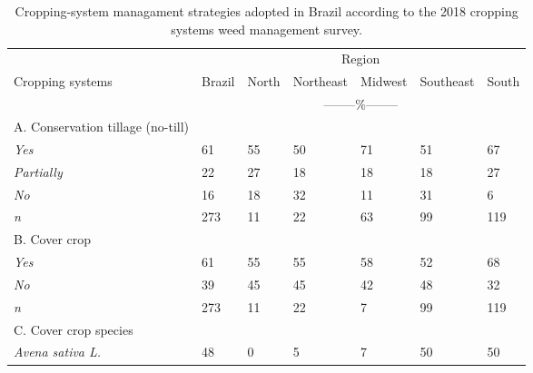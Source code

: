 \documentclass[
  12pt,
  a4paper]{article}
\begin{document}
\begin{table}[ht!]
\centering
\caption{Cropping-system managament strategies adopted in Brazil according to the 2018 cropping systems weed management survey.}
\label{tab:my-table}
\begin{tabular}{@{}lllllll@{}}
\toprule
                                  & \multicolumn{6}{c}{Region}                               \\ \cmidrule(l){2-7} 
Cropping systems                  & Brazil & North & Northeast & Midwest & Southeast & South \\ \hline 
                                  & \multicolumn{6}{c}{--------\%--------}                             \\ 
A. Conservation tillage (no-till) &        &       &           &         &           &       \\
\hspace{3mm}\textit{Yes}                      & 61     & 55    & 50        & 71      & 51        & 67    \\
\hspace{3mm}\textit{Partially}                & 22     & 27    & 18        & 18      & 18        & 27    \\
\hspace{3mm}\textit{No}                       & 16     & 18    & 32        & 11      & 31        & 6     \\
\hspace{3mm}\textit{n}                        & 273    & 11    & 22        & 63      & 99        & 119   \\
B. Cover crop                     &        &       &           &         &           &       \\
\hspace{3mm}\textit{Yes}                      & 61     & 55    & 55        & 58      & 52        & 68    \\
\hspace{3mm}\textit{No}                       & 39     & 45    & 45        & 42      & 48        & 32    \\
\hspace{3mm}\textit{n}                        & 273    & 11    & 22        & 7       & 99        & 119   \\
C. Cover crop species             &        &       &           &         &           &       \\
\hspace{3mm}\textit{Avena sativa L.}               & 48     & 0     & 5         & 7       & 50        & 50    \\

\end{tabular}
\end{table}
\end{document}
